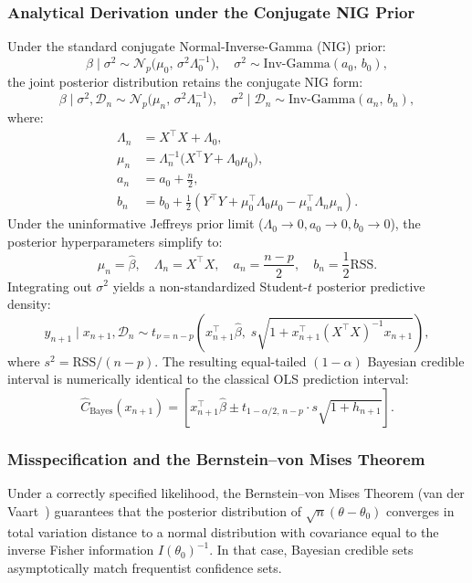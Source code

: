 \documentclass[journal]{IEEEtran}
\begin{document}
\subsubsection{Analytical Derivation under the Conjugate NIG Prior}
Under the standard conjugate Normal-Inverse-Gamma (NIG) prior:
\begin{equation}
\beta \mid \sigma^2 \sim \mathcal{N}_p\big(\mu_0, \, \sigma^2 \Lambda_0^{-1}\big), \quad \sigma^2 \sim \text{Inv-Gamma}(a_0, \, b_0),
\end{equation}
the joint posterior distribution retains the conjugate NIG form:
\begin{equation}
\beta \mid \sigma^2, \mathcal{D}_n \sim \mathcal{N}_p\big(\mu_n, \, \sigma^2 \Lambda_n^{-1}\big), \quad \sigma^2 \mid \mathcal{D}_n \sim \text{Inv-Gamma}(a_n, \, b_n),
\end{equation}
where:
\begin{align}
\Lambda_n &= X^\top X + \Lambda_0, \\
\mu_n &= \Lambda_n^{-1} \big(X^\top Y + \Lambda_0 \mu_0\big), \\
a_n &= a_0 + \frac{n}{2}, \\
b_n &= b_0 + \frac{1}{2} \left( Y^\top Y + \mu_0^\top \Lambda_0 \mu_0 - \mu_n^\top \Lambda_n \mu_n \right).
\end{align}
Under the uninformative Jeffreys prior limit ($\Lambda_0 \to 0, a_0 \to 0, b_0 \to 0$), the posterior hyperparameters simplify to:
\begin{equation}
\mu_n = \hat{\beta}, \quad \Lambda_n = X^\top X, \quad a_n = \frac{n - p}{2}, \quad b_n = \frac{1}{2} \text{RSS}.
\end{equation}
Integrating out $\sigma^2$ yields a non-standardized Student-$t$ posterior predictive density:
\begin{equation}
y_{n+1} \mid x_{n+1}, \mathcal{D}_n \sim t_{\nu = n-p}\left( x_{n+1}^\top \hat{\beta}, \; s \sqrt{1 + x_{n+1}^\top (X^\top X)^{-1} x_{n+1}} \right),
\end{equation}
where $s^2 = \text{RSS} / (n - p)$. The resulting equal-tailed $(1 - \alpha)$ Bayesian credible interval is numerically identical to the classical OLS prediction interval:
\begin{equation}
\hat{C}_{\text{Bayes}}(x_{n+1}) = \left[ x_{n+1}^\top \hat{\beta} \pm t_{1-\alpha/2, \, n-p} \cdot s \sqrt{1 + h_{n+1}} \right].
\end{equation}

\subsubsection{Misspecification and the Bernstein--von Mises Theorem}
Under a correctly specified likelihood, the Bernstein--von Mises Theorem (van der Vaart~\cite{vanderVaart1998}) guarantees that the posterior distribution of $\sqrt{n}(\theta - \theta_0)$ converges in total variation distance to a normal distribution with covariance equal to the inverse Fisher information $I(\theta_0)^{-1}$. In that case, Bayesian credible sets asymptotically match frequentist confidence sets. 
\end{document}
